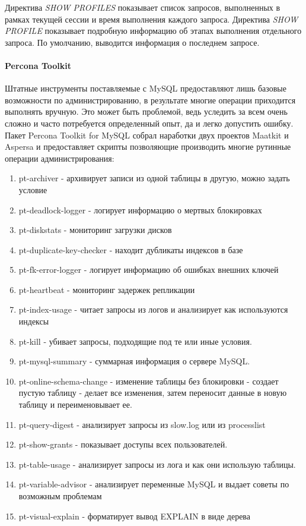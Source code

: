 Директива \textit{SHOW PROFILES} показывает список запросов, выполненных в рамках текущей сессии и время выполнения каждого запроса. Директива \textit{SHOW PROFILE} показывает подробную информацию об этапах выполнения
отдельного запроса. По умолчанию, выводится информация о последнем запросе.

\paragraph{Percona Toolkit}

Штатные инструменты поставляемые с MySQL предоставляют лишь базовые возможности по администрированию, в результате многие операции приходится выполнять вручную. Это может быть проблемой, ведь уследить за всем очень сложно и часто потребуется определенный опыт, да и легко допустить ошибку. Пакет Percona Toolkit for MySQL собрал наработки двух проектов Maatkit и Aspersa и предоставляет скрипты позволяющие производить многие рутинные операции администрирования: \cite{xakep.ru:mysql-admin-toolkit, blog.dh.md:Percona_Toolkit}

\begin{enumerate}
\item pt-archiver - архивирует записи из одной таблицы в другую, можно задать условие
\item pt-deadlock-logger - логирует информацию о мертвых блокировках 
\item pt-diskstats - мониторинг загрузки дисков
\item pt-duplicate-key-checker - находит дубликаты индексов в базе
\item pt-fk-error-logger - логирует информацию об ошибках внешних ключей
\item pt-heartbeat - мониторинг задержек репликации
\item pt-index-usage - читает запросы из логов и анализирует как используются индексы
\item pt-kill - убивает запросы, подходящие под те или иные условия.
\item pt-mysql-summary - суммарная информация о сервере MySQL.
\item pt-online-schema-change - изменение таблицы без блокировки - создает пустую таблицу - делает все изменения, затем переносит данные в новую таблицу и переименовывает ее.
\item pt-query-digest - анализирует запросы из slow.log или из processlist
\item pt-show-grants - показывает доступы всех пользователей.
\item pt-table-usage - анализирует запросы из лога и как они использую таблицы.
\item pt-variable-advisor - анализирует переменные MySQL и выдает советы по возможным проблемам
\item pt-visual-explain - форматирует вывод EXPLAIN в виде дерева
\end{enumerate}